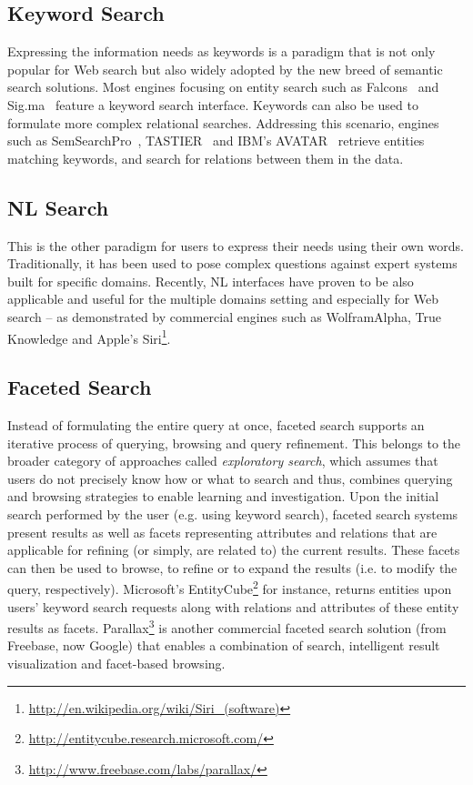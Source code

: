 \subsection{Keyword Search} Expressing the information needs as keywords is a paradigm that is not only popular for Web search but also widely adopted by the new breed of semantic search solutions. Most engines focusing on entity search such as Falcons~\cite{DBLP:journals/ijswis/ChengQ09} and Sig.ma~\cite{DBLP:journals/ws/TummarelloCCDDD10} feature a keyword search interface. Keywords can also be used to formulate more complex relational searches. Addressing this scenario, engines such as SemSearchPro~\cite{DBLP:journals/ws/TranHL11}, TASTIER~\cite{DBLP:conf/sigmod/LiJLF0} and IBM's AVATAR~\cite{DBLP:conf/sigmod/KandoganKRVZ06} retrieve entities matching keywords, and search for relations between them in the data. 
	
	
\subsection{NL Search} This is the other paradigm for users to express their needs using their own words. Traditionally, it has been used to pose complex questions against expert systems built for specific domains. Recently, NL interfaces have proven to be also applicable and useful for the multiple domains setting and especially for Web search -- as demonstrated by commercial engines such as WolframAlpha, True Knowledge and Apple's Siri\footnote{\url{http://en.wikipedia.org/wiki/Siri_(software)}}. 	
	

\subsection{Faceted Search} Instead of formulating the entire query at once, faceted search supports an iterative process of querying, browsing and query refinement. This belongs to the broader category of approaches called \emph{exploratory search}, which assumes that users do not precisely know how or what to search and thus, combines querying and browsing strategies to enable learning and investigation. Upon the initial search performed by the user (e.g. using keyword search), faceted search systems~\cite{DBLP:conf/dexa/WagnerLT11,DBLP:conf/semweb/FerreH11,DBLP:conf/esws/HeimEZ10} present results as well as facets representing attributes and relations that are applicable for refining (or simply, are related to) the current results. These facets can then be used to browse, to refine or to expand the results (i.e. to modify the query, respectively). Microsoft's EntityCube\footnote{\url{http://entitycube.research.microsoft.com/}} for instance, returns entities upon users' keyword search requests along with relations and attributes of these entity results as facets. Parallax\footnote{\url{http://www.freebase.com/labs/parallax/}} is another commercial faceted search solution (from Freebase, now Google) that enables a combination of search, intelligent result visualization and facet-based browsing. 

